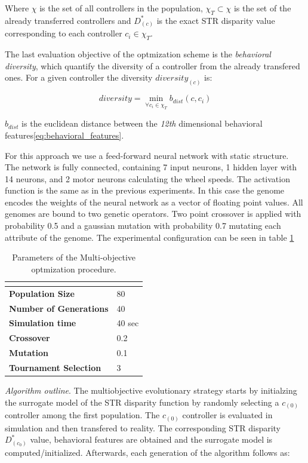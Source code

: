 Where $\chi$ is the set of all controllers in the population, $\chi_T \subset \chi$ is the set of the already transferred controllers and $D^{*}_{(c)}$ is the exact STR disparity value corresponding to each controller $c_i \in \chi_T$.

The last evaluation objective of the optmization scheme is the \emph{behavioral diversity}, which quantify the diversity of a controller from the already transfered ones. For a given controller the diversity $ diversity_{(c)}$ is:

\begin{equation}
	diversity = \min_{\forall c_i \in \chi_T } b_{dist}(c, c_i)
	\label{eq:behavioral_diversity}
\end{equation}

$b_{dist}$ is the euclidean distance between the \emph{12th} dimensional behavioral features\ref{eq:behavioral_features}.

For this approach we use a feed-forward neural network with static structure. The network is fully connected, containing 7 input neurons, 1 hidden layer with 14 neurons, and 2 motor neurons calculating the wheel speeds. The activation function is the same as in the previous experiments. In this case the genome encodes the weights of the neural network as a vector of floating point values. All genomes are bound to two genetic operators. Two point crossover is applied with probability 0.5 and a gaussian mutation with probability 0.7 mutating each attribute of the genome. The experimental configuration can be seen in table \ref{tab:moea_parameters}

\begin{table}[H]
\begin{tabular}{ll}
\hline
\textbf{}                      & \textbf{} \\ \hline
\textbf{Population Size}       & 80        \\
\textbf{Number of Generations} & 40        \\
\textbf{Simulation time}       & 40 sec    \\
\textbf{Crossover}             & 0.2       \\
\textbf{Mutation}              & 0.1       \\
\textbf{Tournament Selection}  & 3        
\end{tabular}
\caption{Parameters of the Multi-objective optmization procedure.}
\label{tab:moea_parameters}
\end{table}


\emph{Algorithm outline}. The multiobjective evolutionary strategy starts by initialzing the surrogate model of the STR disparity function by randomly selecting a $c_{(0)}$ controller among the first population. The $c_{(0)}$ controller is evaluated in simulation and then transfered to reality. The corresponding STR disparity $ D^{*}_{(c_0)}$ value, behavioral features are obtained and the surrogate model is computed/initialized. Afterwards, each generation of the algorithm follows as:

